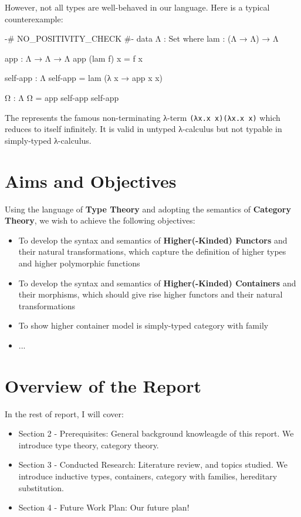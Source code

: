 However, not all types are well-behaved in our language. Here is a typical counterexample:

\begin{code}
{-# NO_POSITIVITY_CHECK #-}
data Λ : Set where
  lam : (Λ → Λ) → Λ

app : Λ → Λ → Λ
app (lam f) x = f x

self-app : Λ
self-app = lam (λ x → app x x)

Ω : Λ
Ω = app self-app self-app
\end{code}

The  represents the famous non-terminating λ-term \texttt{(λx.x x)(λx.x x)} which reduces to itself infinitely. It is valid in untyped λ-calculus but not typable in simply-typed λ-calculus. 

\section{Aims and Objectives}

Using the language of \textbf{Type Theory} and adopting the semantics of \textbf{Category Theory}, we wish to achieve the following objectives:

\begin{itemize}
  \item{To develop the syntax and semantics of \textbf{Higher(-Kinded) Functors} and their natural transformations, which capture the definition of higher types and higher polymorphic functions}
  \item{To develop the syntax and semantics of \textbf{Higher(-Kinded) Containers} and their morphisms, which should give rise higher functors and their natural transformations}
  \item{To show higher container model is simply-typed category with family}
  \item{...}
\end{itemize}

\section{Overview of the Report}

In the rest of report, I will cover:
\begin{itemize}
  \item{Section 2 - Prerequisites: General background knowleagde of this report. We introduce type theory, category theory.}
  \item{Section 3 - Conducted Research: Literature review, and topics studied. We introduce inductive types, containers, category with families, hereditary substitution.}
  \item{Section 4 - Future Work Plan: Our future plan!}
\end{itemize}

